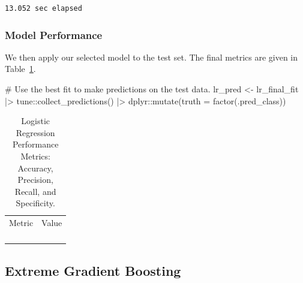 \documentclass[
  letterpaper,
  DIV=11,
  numbers=noendperiod]{scrartcl}
\newenvironment{Shaded}{\begin{snugshade}}{\end{snugshade}}
\newcommand{\AttributeTok}[1]{\textcolor[rgb]{0.40,0.45,0.13}{#1}}
\newcommand{\CommentTok}[1]{\textcolor[rgb]{0.37,0.37,0.37}{#1}}
\newcommand{\FunctionTok}[1]{\textcolor[rgb]{0.28,0.35,0.67}{#1}}
\newcommand{\NormalTok}[1]{\textcolor[rgb]{0.00,0.23,0.31}{#1}}
\newcommand{\OtherTok}[1]{\textcolor[rgb]{0.00,0.23,0.31}{#1}}
\newcommand{\SpecialCharTok}[1]{\textcolor[rgb]{0.37,0.37,0.37}{#1}}
\begin{document}
\begin{verbatim}
13.052 sec elapsed
\end{verbatim}

\subsubsection{Model Performance}\label{model-performance-3}

We then apply our selected model to the test set. The final metrics are
given in Table~\ref{tbl-lr-performance}.

\begin{Shaded}
\begin{Highlighting}[]
\CommentTok{\# Use the best fit to make predictions on the test data.}
\NormalTok{lr\_pred }\OtherTok{\textless{}{-}} 
\NormalTok{  lr\_final\_fit }\SpecialCharTok{|\textgreater{}} 
\NormalTok{  tune}\SpecialCharTok{::}\FunctionTok{collect\_predictions}\NormalTok{() }\SpecialCharTok{|\textgreater{}}
\NormalTok{  dplyr}\SpecialCharTok{::}\FunctionTok{mutate}\NormalTok{(}\AttributeTok{truth =} \FunctionTok{factor}\NormalTok{(.pred\_class))}
\end{Highlighting}
\end{Shaded}

\begin{longtable}{>{\raggedright\arraybackslash}p{}>{\raggedleft\arraybackslash}p{}}

\newpage

\caption{\label{tbl-lr-performance}Logistic Regression Performance
Metrics: Accuracy, Precision, Recall, and Specificity.}

\tabularnewline

\toprule
Metric & Value \\ 
\midrule\addlinespace[2.5pt]
\cellcolor[HTML]{FFFFFF}{Accuracy} & \cellcolor[HTML]{FFFFFF}{93.4} \\ 
\cellcolor[HTML]{FFFFFF}{Precision} & \cellcolor[HTML]{FFFFFF}{84.6} \\ 
\cellcolor[HTML]{FFFFFF}{Recall} & \cellcolor[HTML]{FFFFFF}{91.7} \\ 
\cellcolor[HTML]{FFFFFF}{Specificity} & \cellcolor[HTML]{FFFFFF}{94.0} \\ 
\bottomrule

\end{longtable}

\subsection{Extreme Gradient Boosting}\label{extreme-gradient-boosting}
\end{document}
